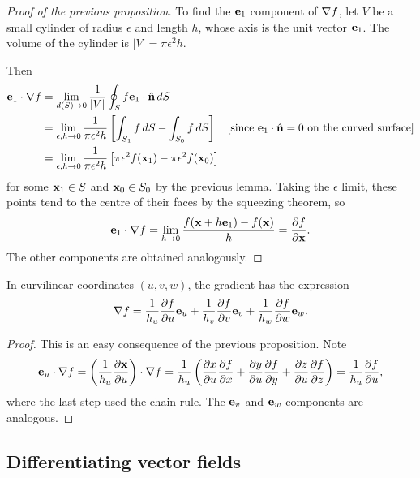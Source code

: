 \documentclass[10pt, a4paper]{article}
\begin{document}
\begin{proof}[Proof of the previous proposition]
    To find the $\mbf{e}_1$ component of $\mbf{\nabla}f$,
    let $V$ be a small cylinder of radius $\epsilon$ and length $h$,
    whose axis is the unit vector $\mbf{e}_1$.
    The volume of the cylinder is $|V| = \pi\epsilon ^ 2h$.

    Then
    \begin{align*}
        \mbf{e}_1 \cdot \mbf{\nabla}f &= \lim_{d(S) \to 0}\frac{1}{|V|}\oint_{S}f\mbf{e}_1 \cdot \hat{\mbf{n}}\,dS \\
        &= \lim_{\epsilon, h \to 0}\frac{1}{\pi\epsilon ^ 2h}\left[\int_{S_1}f\,dS - \int_{S_0}f\,dS\right]\quad[\text{since $\mbf{e}_1 \cdot \hat{\mbf{n}} = 0$ on the curved surface}] \\
        &= \lim_{\epsilon, h \to 0}\frac{1}{\pi\epsilon ^ 2h}\left[\pi\epsilon ^ 2f(\mbf{x}_1) - \pi\epsilon ^ 2f(\mbf{x}_0)\right]
    \end{align*}
    for some $\mbf{x}_1 \in S$ and $\mbf{x}_0 \in S_0$ by the previous lemma.
    Taking the $\epsilon$ limit,
    these points tend to the centre of their faces by the squeezing theorem,
    so
    \[
    \mbf{e}_1 \cdot \mbf{\nabla}f = \lim_{h \to 0}\frac{f(\mbf{x} + h\mbf{e}_1) - f(\mbf{x})}{h} = \pd[f]{\mbf{x}}.
    \]
    The other components are obtained analogously.
\end{proof}

\begin{proposition}
    In curvilinear coordinates $(u, v, w)$,
    the gradient has the expression
    \[
    \mbf{\nabla}f = \frac{1}{h_u}\pd[f]{u}\mbf{e}_u + \frac{1}{h_v}\pd[f]{v}\mbf{e}_v + \frac{1}{h_w}\pd[f]{w}\mbf{e}_w.
    \]

    \begin{proof}
        This is an easy consequence of the previous proposition.
        Note
        \[
        \mbf{e}_u \cdot \mbf{\nabla}f = \left(\frac{1}{h_u}\pd[\mbf{x}]{u}\right)\cdot\mbf{\nabla}f = \frac{1}{h_u}\left(\pd[x]{u}\pd[f]{x} + \pd[y]{u}\pd[f]{y} + \pd[z]{u}\pd[f]{z}\right) = \frac{1}{h_u}\pd[f]{u},
        \]
        where the last step used the chain rule.
        The $\mbf{e}_v$ and $\mbf{e}_w$ components are analogous.
    \end{proof}
\end{proposition}

\subsection{Differentiating vector fields}
\end{document}
